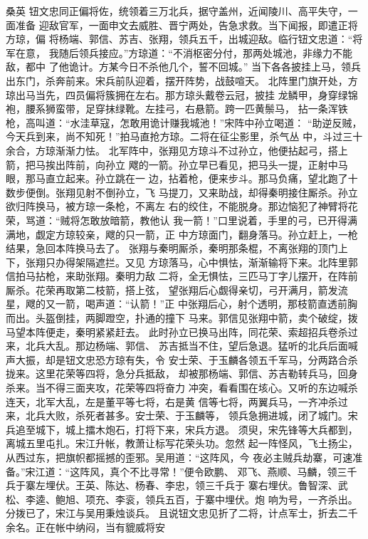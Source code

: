 桑英
钮文忠同正偏将佐，统领着三万北兵，据守盖州，近闻陵川、高平失守，一面准备
迎敌官军，一面申文去威胜、晋宁两处，告急求救。当下闻报，即遣正将方琼，偏
将杨端、郭信、苏吉、张翔，领兵五千，出城迎敌。临行钮文忠道：“将军在意，
我随后领兵接应。”方琼道：“不消枢密分付，那两处城池，非缘力不能敌，都中
了他诡计。方某今日不杀他几个，誓不回城。”
当下各各披挂上马，领兵出东门，杀奔前来。宋兵前队迎着，摆开阵势，战鼓喧天。
北阵里门旗开处，方琼出马当先，四员偏将簇拥在左右。那方琼头戴卷云冠，披挂
龙鳞甲，身穿绿锦袍，腰系狮蛮带，足穿抹绿靴。左挂弓，右悬箭。跨一匹黄鬃马，
拈一条浑铁枪，高叫道：“水洼草寇，怎敢用诡计赚我城池！”宋阵中孙立喝道：
“助逆反贼，今天兵到来，尚不知死！”拍马直抢方琼。二将在征尘影里，杀气丛
中，斗过三十余合，方琼渐渐力怯。
北军阵中，张翔见方琼斗不过孙立，他便拈起弓，搭上箭，把马挨出阵前，向孙立
飕的一箭。孙立早已看见，把马头一提，正射中马眼，那马直立起来。孙立跳在一
边，拈着枪，便来步斗。那马负痛，望北跑了十数步便倒。张翔见射不倒孙立，飞
马提刀，又来助战，却得秦明接住厮杀。孙立欲归阵换马，被方琼一条枪，不离左
右的绞住，不能脱身。那边恼犯了神臂将花荣，骂道：“贼将怎敢放暗箭，教他认
我一箭！”口里说着，手里的弓，已开得满满地，觑定方琼较亲，飕的只一箭，正
中方琼面门，翻身落马。孙立赶上，一枪结果，急回本阵换马去了。
张翔与秦明厮杀，秦明那条棍，不离张翔的顶门上下，张翔只办得架隔遮拦。又见
方琼落马，心中惧怯，渐渐输将下来。北阵里郭信拍马拈枪，来助张翔。秦明力敌
二将，全无惧怯，三匹马丁字儿摆开，在阵前厮杀。花荣再取第二枝箭，搭上弦，
望张翔后心觑得亲切，弓开满月，箭发流星，飕的又一箭，喝声道：“认箭！”正
中张翔后心，射个透明，那枝箭直透前胸而出。头盔倒挂，两脚蹬空，扑通的撞下
马来。郭信见张翔中箭，卖个破绽，拨马望本阵便走，秦明紧紧赶去。
此时孙立已换马出阵，同花荣、索超招兵卷杀过来，北兵大乱。那边杨端、郭信、
苏吉抵当不住，望后急退。猛听的北兵后面喊声大振，却是钮文忠恐方琼有失，令
安士荣、于玉麟各领五千军马，分两路合杀拢来。这里花荣等四将，急分兵抵敌，
却被那杨端、郭信、苏吉勒转兵马，回身杀来。当不得三面夹攻，花荣等四将奋力
冲突，看看围在垓心。又听的东边喊杀连天，北军大乱，左是董平等七将，右是黄
信等七将，两翼兵马，一齐冲杀过来，北兵大败，杀死者甚多。安士荣、于玉麟等，
领兵急拥进城，闭了城门。宋兵追至城下，城上擂木炮石，打将下来，宋兵方退。
须臾，宋先锋等大兵都到，离城五里屯扎。宋江升帐，教萧让标写花荣头功。忽然
起一阵怪风，飞土扬尘，从西过东，把旗帜都摇撼的歪邪。吴用道：“这阵风，今
夜必主贼兵劫寨，可速准备。”宋江道：“这阵风，真个不比寻常！”便令欧鹏、
邓飞、燕顺、马麟，领三千兵于寨左埋伏。王英、陈达、杨春、李忠，领三千兵于
寨右埋伏。鲁智深、武松、李逵、鲍旭、项充、李衮，领兵五百，于寨中埋伏。炮
响为号，一齐杀出。分拨已了，宋江与吴用秉烛谈兵。
且说钮文忠见折了二将，计点军士，折去二千余名。正在帐中纳闷，当有貔威将安
